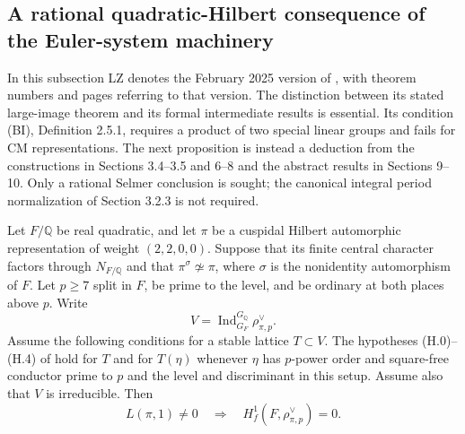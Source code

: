 \subsection{A rational quadratic-Hilbert consequence of the Euler-system machinery}
\label{subsec:lm-lz-rational}

In this subsection LZ denotes the February 2025 version of
\citet{LoefflerZerbes2025}, with theorem numbers and pages referring
to that version.  The distinction between its
stated large-image theorem and its formal intermediate results is
essential.  Its condition (BI), Definition 2.5.1, requires a product of
two special linear groups and fails for CM representations.  The next
proposition is instead a deduction from the constructions in Sections
3.4--3.5 and 6--8 and the abstract results in Sections 9--10.  Only a
rational Selmer conclusion is sought; the canonical integral period
normalization of Section 3.2.3 is not required.

\begin{proposition}
\label{prop:lm-rational-hilbert}
Let $F/\mathbb Q$ be real quadratic, and let $\pi$ be a cuspidal Hilbert
automorphic representation of weight $(2,2,0,0)$.  Suppose that its
finite central character factors through $N_{F/\mathbb Q}$ and that
$\pi^\sigma\not\simeq\pi$, where $\sigma$ is the nonidentity automorphism
of $F$.  Let $p\geq7$ split in $F$, be prime to the level, and be ordinary
at both places above $p$.  Write
\[
 V=\operatorname{Ind}_{G_F}^{G_{\mathbb Q}}\rho_{\pi,p}^{\vee}.
\]
Assume the following conditions for a stable lattice $T\subset V$.
The hypotheses (H.0)--(H.4) of
\citet[\S3.5, pp.~27--28]{MazurRubin2004} hold for
$T$ and for $T(\eta)$ whenever $\eta$ has $p$-power order and square-free
conductor prime to $p$ and the level and discriminant in this setup.
Assume also that $V$ is irreducible.
Then
\[
 L(\pi,1)\ne0\quad\Longrightarrow\quad H^1_f(F,\rho_{\pi,p}^{\vee})=0.
\]
\end{proposition}

